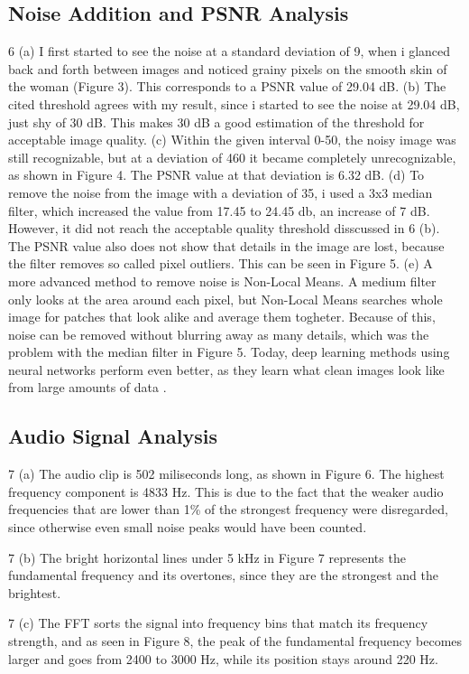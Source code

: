 \documentclass[11pt,a4paper]{article}
\begin{document}
\subsection{Noise Addition and PSNR Analysis}
6 (a) I first started to see the noise at a standard deviation of 9, when i glanced back and forth between images and noticed grainy pixels on the smooth skin of the woman (Figure 3). This corresponds to a PSNR value of 29.04 dB.
 (b) The cited threshold agrees with my result, since i started to see the noise at 29.04 dB, just shy of 30 dB. This makes 30 dB a good estimation of the threshold for acceptable image quality.
 (c) Within the given interval 0-50, the noisy image was still recognizable, but at a deviation of 460 it became completely unrecognizable, as shown in Figure 4. The PSNR value at that deviation is 6.32 dB.
 (d) To remove the noise from the image with a deviation of 35, i used a 3x3 median filter, which increased the value from 17.45 to 24.45 db, an increase of 7 dB. However, it did not reach the acceptable quality threshold disscussed in 6 (b). The PSNR value also does not show that details in the image are lost, because the filter removes so called pixel outliers. This can be seen in Figure 5.
 (e) A more advanced method to remove noise is Non-Local Means. A medium filter only looks at the area around each pixel, but Non-Local Means searches whole image for patches that look alike and average them togheter. Because of this, noise can be removed without blurring away as many details, which was the problem with the median filter in Figure 5. Today, deep learning methods using neural networks perform even better, as they learn what clean images look like from large amounts of data \cite{eladImageDenoisingDeep2023}.
\subsection{Audio Signal Analysis}

7 (a) The audio clip is 502 miliseconds long, as shown in Figure 6. The highest frequency component is 4833 Hz. This is due to the fact that the weaker audio frequencies that are lower than 1\% of the strongest frequency were disregarded, since otherwise even small noise peaks would have been counted.

7 (b) The bright horizontal lines under 5 kHz in Figure 7 represents the fundamental frequency and its overtones, since they are the strongest and the brightest.

7 (c) The FFT sorts the signal into frequency bins that match its frequency strength, and as seen in Figure 8, the peak of the fundamental frequency becomes larger and goes from 2400 to 3000 Hz, while its position stays around 220 Hz.
\end{document}
